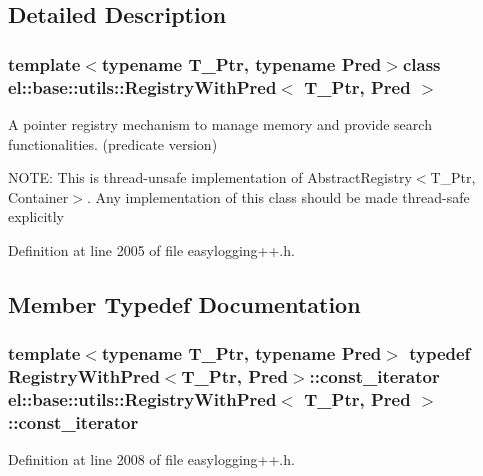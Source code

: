 \subsection{Detailed Description}
\subsubsection*{template$<$typename T\+\_\+\+Ptr, typename Pred$>$class el\+::base\+::utils\+::\+Registry\+With\+Pred$<$ T\+\_\+\+Ptr, Pred $>$}

A pointer registry mechanism to manage memory and provide search functionalities. (predicate version) 

N\+O\+T\+E\+: This is thread-\/unsafe implementation of Abstract\+Registry$<$\+T\+\_\+\+Ptr, Container$>$. Any implementation of this class should be made thread-\/safe explicitly 

Definition at line 2005 of file easylogging++.\+h.



\subsection{Member Typedef Documentation}
\hypertarget{classel_1_1base_1_1utils_1_1_registry_with_pred_ad9af7a8eeedd58a75eb70bccb334f6dc}{}
\subsubsection[{const\+\_\+iterator}]{\setlength{\rightskip}{0pt plus 5cm}template$<$typename T\+\_\+\+Ptr, typename Pred$>$ typedef {\bf Registry\+With\+Pred}$<$T\+\_\+\+Ptr, Pred$>$\+::{\bf const\+\_\+iterator} {\bf el\+::base\+::utils\+::\+Registry\+With\+Pred}$<$ T\+\_\+\+Ptr, Pred $>$\+::{\bf const\+\_\+iterator}}\label{classel_1_1base_1_1utils_1_1_registry_with_pred_ad9af7a8eeedd58a75eb70bccb334f6dc}


Definition at line 2008 of file easylogging++.\+h.

\hypertarget{classel_1_1base_1_1utils_1_1_registry_with_pred_afc03d2d0a72f5ebf03e1e3b37bd9932d}{}
